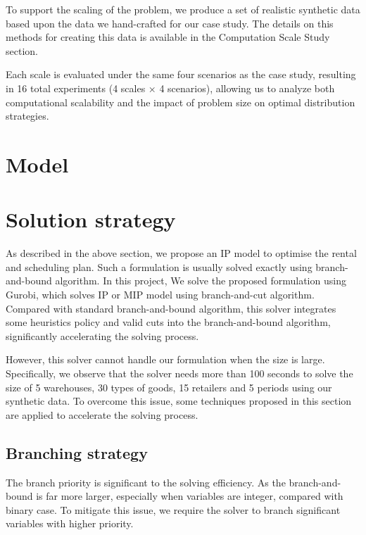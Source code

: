 \documentclass[a4paper,12pt]{article}
\begin{document}
To support the scaling of the problem, we produce a set of realistic synthetic data based upon the data we hand-crafted for our case study. The details on this methods for creating this data is available in the Computation Scale Study section.

Each scale is evaluated under the same four scenarios as the case study, resulting in 16 total experiments (4 scales × 4 scenarios), allowing us to analyze both computational scalability and the impact of problem size on optimal distribution strategies.




\section{Model}\label{sec:model}


\section{Solution strategy}\label{sec:solution-strategy}

As described in the above section, we propose an IP model to optimise the rental and scheduling plan. Such a formulation is usually solved exactly using branch-and-bound algorithm. In this project, We solve the proposed formulation using Gurobi, which solves IP or MIP model using branch-and-cut algorithm. Compared with standard branch-and-bound algorithm, this solver integrates some heuristics policy and valid cuts into the branch-and-bound algorithm, significantly accelerating the solving process.

However, this solver cannot handle our formulation when the size is large. Specifically, we observe that the solver needs more than 100 seconds to solve the size of 5 warehouses, 30 types of goods, 15 retailers and 5 periods using our synthetic data. To overcome this issue, some techniques proposed in this section are applied to accelerate the solving process.



\subsection{Branching strategy}\label{subsec:branching-strategy}
The branch priority is significant to the solving efficiency. As the branch-and-bound is far more larger, especially when variables are integer, compared with binary case. To mitigate this issue, we require the solver to branch significant variables with higher priority.
\end{document}
